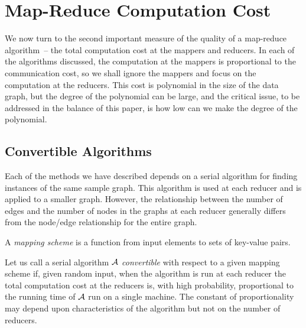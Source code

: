 \section{Map-Reduce Computation Cost}
\label{comp-cost-sect}

We now turn to the second important measure of the quality of a map-reduce algorithm~-- the total computation cost at the mappers and reducers.  In each of the algorithms discussed, the computation at the mappers is proportional to the communication cost, so we shall ignore the mappers and focus on the computation at the reducers.  This cost is polynomial in the size of the data graph, but the degree of the polynomial can be large, and the critical issue, to be addressed in the balance of this paper, is how low can we make the degree of the polynomial.

\subsection{Convertible Algorithms}
\label{conv-alg-subsect}

Each of the methods we have described depends on a serial algorithm for finding instances of the same sample graph.  This algorithm is used at each reducer and is applied to a smaller graph.
However, the relationship between the number of edges and the number of nodes in the graphs at each reducer generally differs from the node/edge relationship for the entire graph.

\begin{definition}
A {\em mapping scheme} is a function from input elements to sets of key-value pairs.
\end{definition}

\begin{definition}
Let us call a serial algorithm $\cal A$ {\em convertible} with respect to a given mapping scheme if, given random input, when the algorithm is run at each reducer the total computation cost at the reducers is, with high probability, proportional to the running time of $\cal A$ run on a single machine.  The constant of proportionality may depend upon characteristics of the algorithm but not on the number of reducers.
\end{definition}

